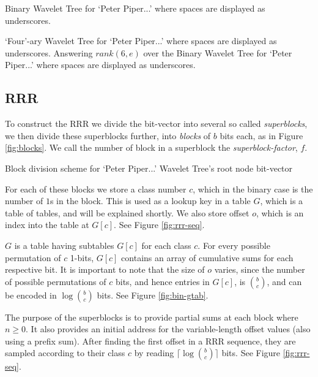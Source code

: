 			{Binary Wavelet Tree for `Peter Piper...' where spaces are displayed
			as underscores.}
			
			{`Four'-ary Wavelet Tree for `Peter Piper...' where spaces are 
			displayed as underscores.}
\clearpage
			{Answering $rank(6, e)$ over the Binary Wavelet Tree for `Peter
			Piper...' where spaces are displayed as underscores.}

\subsection{RRR}
To construct the RRR we divide the bit-vector into several so called 
\emph{superblocks}, we then divide these superblocks further, into 
\emph{blocks} of $b$ bits each, as in Figure \ref{fig:blocks}. We call the 
number of block in a superblock the \emph{superblock-factor}, $f$.

			{Block division scheme for `Peter Piper...' Wavelet Tree's root
			node bit-vector}

For each of these blocks we store a class number $c$, which in the binary case 
is the number of  $1$s in the block. This is used as a lookup key in a table 
$G$, which is a table of tables, and will be explained shortly. We also store 
offset $o$, which is an index into the table at $G[c]$. See Figure 
\ref{fig:rrr-seq}.

$G$ is a table having subtables $G[c]$ for each class $c$. For every possible 
permutation of $c$ 1-bits, $G[c]$ contains an array of cumulative sums for each 
respective bit. It is important to note that the size of $o$ varies, since 
the number of possible permutations of $c$ bits, and hence entries in $G[c]$, is $b \choose c$, and can be encoded in $\log {b \choose c}$ bits. See Figure \ref{fig:bin-gtab}.

The purpose of the superblocks is to provide partial sums at each block where $n 
\ge 0$. It also provides an initial address for the variable-length offset 
values (also using a prefix sum). After finding the first offset in a RRR
sequence, they are sampled according to their class $c$ by reading $\lceil\log 
{b \choose c}\rceil$ bits. See Figure \ref{fig:rrr-seq}.

